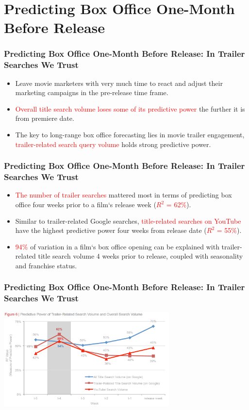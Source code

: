 \documentclass[slidestop,compress,red,mathserif]{beamer}
\begin{document}
\section{Predicting Box Office One-Month Before Release}
\begin{frame}
\frametitle{Predicting Box Office One-Month Before Release: In Trailer Searches We Trust}
\begin{itemize}
	\pause \item Leave movie marketers with very much time to react and adjust their marketing campaigns in the pre-release time frame.
	\pause \item  \textcolor{red}{Overall title search volume loses some of its predictive power} the further it is from premiere date.
	\pause \item The key to long-range box office forecasting lies in movie trailer engagement,  \textcolor{red}{trailer-related search query volume} holds strong predictive power.
\end{itemize}
\end{frame}
\begin{frame}
\frametitle{Predicting Box Office One-Month Before Release: In Trailer Searches We Trust}
\begin{itemize}
	\pause \item \textcolor{red}{The number of trailer searches} mattered most in terms of predicting box office four weeks prior to a film`s release week (\textcolor{red}{$R^2$ = 62\%}).
	\pause \item Similar to trailer-related Google searches,  \textcolor{red}{title-related searches on YouTube} have the highest predictive power four weeks from release date (\textcolor{red}{$R^2$ = 55\%}).
	\pause \item \textcolor{red}{94\%} of variation in a film`s box office opening can be explained with trailer-related title search volume 4 weeks prior to release, coupled with seasonality and franchise status.
\end{itemize}
\end{frame}
\begin{frame}
\frametitle{Predicting Box Office One-Month Before Release: In Trailer Searches We Trust}
\begin{center}
\includegraphics[width=9cm]{fig6.png}
\end{center}
\end{frame}
\end{document}
